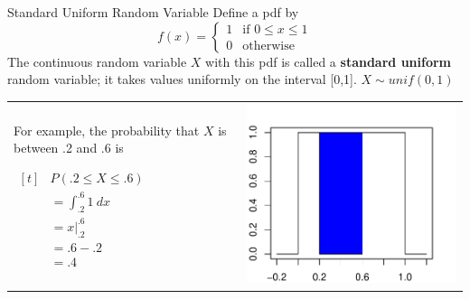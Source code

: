 \documentclass[handout]{beamer}
\begin{document}
        \begin{frame}{Standard Uniform Random Variable}
            Define a pdf by
            $$f(x)=\begin{cases}1 & \text{if }0\leq x\leq 1 \\
            0 & \text{otherwise}\end{cases}$$
            The continuous random variable $X$ with this pdf is called a \textbf{standard uniform} random variable; it takes values uniformly on the interval [0,1]. $X\sim unif(0,1)$
            \begin{tabular}{@{}p{5.5cm}p{4.5cm}}
            \vspace{0cm}For example, the probability that $X$ is between .2 and .6 is
            \begin{center}$\begin{aligned}[t]
            &P(.2 \leq X \leq .6) \\
            &=\int_{.2}^{.6} 1\ dx\\
            &= x\vert_{.2}^{.6}\\
            &= .6-.2\\
            &=.4
            \end{aligned}$\end{center}
            &
            \vspace{0cm}\includegraphics[scale=.6]{ch4_pdf_unif.pdf}
            \end{tabular}
            \end{frame}
            
\end{document}
